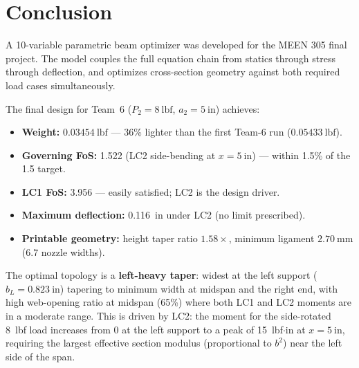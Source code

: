 \documentclass[11pt,letterpaper]{article}
\begin{document}
\section{Conclusion}
\label{sec:conclusion}

A 10-variable parametric beam optimizer was developed for the MEEN 305 final
project.  The model couples the full equation chain from statics through stress
through deflection, and optimizes cross-section geometry against both required
load cases simultaneously.

The final design for Team~6 ($P_2 = 8\ \mathrm{lbf}$, $a_2 = 5\ \mathrm{in}$) achieves:

\begin{itemize}[noitemsep]
  \item \textbf{Weight:} $0.03454\ \mathrm{lbf}$ --- 36\% lighter than the
    first Team-6 run ($0.05433\ \mathrm{lbf}$).
  \item \textbf{Governing FoS:} 1.522 (LC2 side-bending at $x = 5\ \mathrm{in}$)
    --- within 1.5\% of the 1.5 target.
  \item \textbf{LC1 FoS:} 3.956 --- easily satisfied; LC2 is the design driver.
  \item \textbf{Maximum deflection:} 0.116~in under LC2 (no limit prescribed).
  \item \textbf{Printable geometry:} height taper ratio $1.58\times$,
    minimum ligament $2.70\ \mathrm{mm}$ ($6.7$ nozzle widths).
\end{itemize}

The optimal topology is a \textbf{left-heavy taper}: widest at the left
support ($b_L = 0.823\ \mathrm{in}$) tapering to minimum width at midspan
and the right end, with high web-opening ratio at midspan (65\%) where both
LC1 and LC2 moments are in a moderate range.  This is driven by LC2:
the moment for the side-rotated 8~lbf load increases from 0 at the left
support to a peak of 15~lbf$\cdot$in at $x = 5\ \mathrm{in}$, requiring
the largest effective section modulus (proportional to $b^2$) near the left
side of the span.
\end{document}
